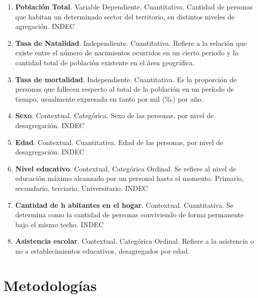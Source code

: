 \documentclass{article}
\theoremstyle{mytheoremstyle}
\theoremstyle{mytheoremstyle}
\theoremstyle{myproblemstyle}
\begin{document}
\begin{enumerate}
  \item \textbf{Población Total}. Variable Dependiente. Cuantitativa. Cantidad de personas que habitan un determinado sector del territorio, en distintos niveles de agregación. INDEC
  \item \textbf{Tasa de Natalidad}. Independiente. Cuantitativa. Refiere a la relación que existe entre el número de nacimientos ocurridos en un cierto periodo y la cantidad total de población existente en el área geográfica. 
  \item \textbf{Tasa de mortalidad}. Independiente. Cuantitativa. Es la proporción de personas que fallecen respecto al total de la población en un período de tiempo, usualmente expresada en tanto por mil (‰) por año.
  \item \textbf{Sexo}. Contextual. Categórica. Sexo de las personas, por nivel de desagregación. INDEC
  \item \textbf{Edad}. Contextual. Cuantitativa. Edad de las personas, por nivel de desagregación. INDEC
  \item\textbf{Nivel educativo}.  Contextual. Categórica Ordinal.  Se refiere al nivel de educación máximo alcanzado por un personal hasta el momento. Primario, secundario, terciario, Universitario. INDEC
  \item \textbf{Cantidad de h abitantes en el hogar}. Contextual. Cuantitativa.  Se determina como la cantidad de personas conviviendo de forma permanente bajo el mismo techo. INDEC
  \item \textbf{Asistencia escolar}. Contextual. Categórica Ordinal.  Refiere a la asistencia o no a establecimientos educativos, desagregados por edad. 
\end{enumerate}

\section{Metodologías}
\end{document}

